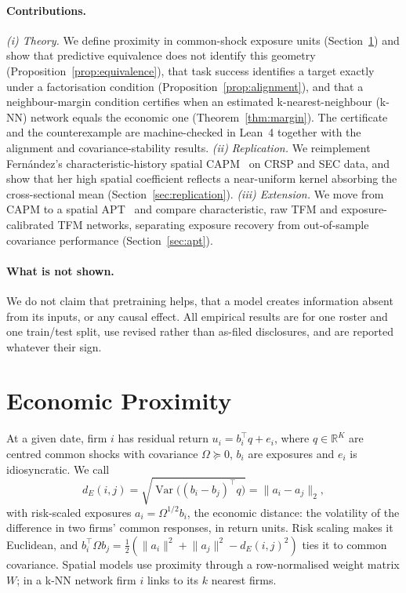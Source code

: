 \documentclass[letterpaper]{article} %
\theoremstyle{definition}
\newcommand{\R}{\mathbb{R}}
\newcommand{\norm}[1]{\lVert #1\rVert}
\begin{document}
\paragraph{Contributions.}
\emph{(i) Theory.} We define proximity in common-shock exposure units
(Section~\ref{sec:setup}) and show that predictive equivalence does not
identify this geometry (Proposition~\ref{prop:equivalence}), that task success
identifies a target exactly under a factorisation condition
(Proposition~\ref{prop:alignment}), and that a neighbour-margin condition
certifies when an estimated k-nearest-neighbour (k-NN) network equals the
economic one (Theorem~\ref{thm:margin}). The certificate and the counterexample
are machine-checked in Lean~4 together with the alignment and
covariance-stability results. \emph{(ii) Replication.} We reimplement
Fern\'andez's characteristic-history spatial CAPM~\citep{fernandez2011} on
CRSP and SEC data, and show that her high spatial coefficient reflects a
near-uniform kernel absorbing the cross-sectional mean
(Section~\ref{sec:replication}). \emph{(iii) Extension.} We move from CAPM to a
spatial APT~\citep{kou2018} and compare characteristic, raw TFM and
exposure-calibrated TFM networks, separating exposure recovery from
out-of-sample covariance performance (Section~\ref{sec:apt}).

\paragraph{What is not shown.} We do not claim that pretraining helps, that a
model creates information absent from its inputs, or any causal effect. All
empirical results are for one roster and one train/test split, use revised
rather than as-filed disclosures, and are reported whatever their sign.

\section{Economic Proximity}\label{sec:setup}
At a given date, firm $i$ has residual return $u_i=b_i^\top q+e_i$, where
$q\in\R^K$ are centred common shocks with covariance $\Omega\succeq0$, $b_i$ are
exposures and $e_i$ is idiosyncratic. We call
\begin{equation}\label{eq:distance}
  d_E(i,j)=\sqrt{\operatorname{Var}\bigl((b_i-b_j)^\top q\bigr)}
  =\norm{a_i-a_j}_2,
\end{equation}
with risk-scaled exposures $a_i=\Omega^{1/2}b_i$,
the economic distance: the volatility of the difference in two firms' common
responses, in return units. Risk scaling makes it Euclidean, and
$b_i^\top\Omega b_j=\tfrac12(\norm{a_i}^2+\norm{a_j}^2-d_E(i,j)^2)$ ties it to
common covariance. Spatial models use proximity through a row-normalised
weight matrix $W$; in a k-NN network firm $i$ links to its $k$ nearest firms.
\end{document}
